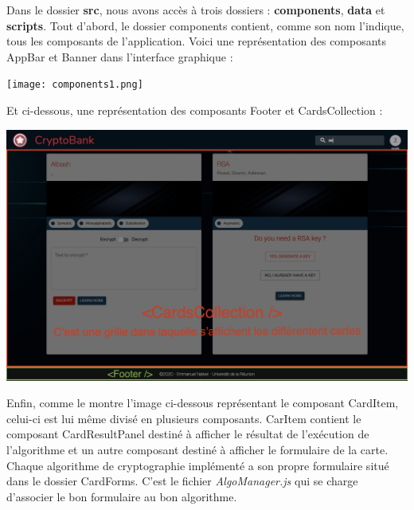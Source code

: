 \documentclass{article}
\begin{document}
Dans le dossier \textbf{src}, nous avons accès à trois dossiers : \textbf{components}, \textbf{data} et \textbf{scripts}. 
Tout d'abord, le dossier components contient, comme son nom l'indique, tous les composants de l'application. Voici une représentation des composants AppBar et Banner dans l'interface graphique :

\bigskip
\bigskip

\begin{center}
  \texttt{[image: components1.png]}
\end{center}

\cleardoublepage

Et ci-dessous, une représentation des composants Footer et CardsCollection :
\bigskip
\begin{center}
  \includegraphics[scale=0.1]{components2.png}
\end{center}
\bigskip

Enfin, comme le montre l'image ci-dessous représentant le composant CardItem, celui-ci est lui même divisé en plusieurs composants. CarItem contient le composant CardResultPanel destiné à afficher le résultat de l'exécution de l'algorithme et un autre composant destiné à afficher le formulaire de la carte. Chaque algorithme de cryptographie implémenté a son propre formulaire situé dans le dossier CardForms. C'est le fichier \textit{AlgoManager.js} qui se charge d'associer le bon formulaire au bon algorithme. 
\end{document}
